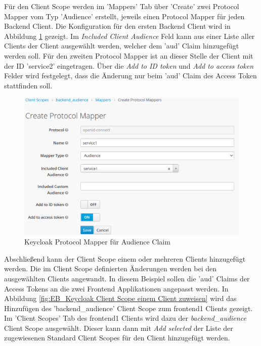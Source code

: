 Für den Client Scope werden im 'Mappers' Tab über 'Create' zwei Protocol Mapper vom Typ 'Audience' erstellt, jeweils einen Protocol Mapper für jeden Backend Client. Die Konfiguration für den ersten Backend Client wird in Abbildung \ref{fig:EB_Keycloak Protocol Mapper für Audience Claim} gezeigt. Im \textit{Included Client Audience} Feld kann aus einer Liste aller Clients der Client ausgewählt werden, welcher dem 'aud' Claim hinzugefügt werden soll. Für den zweiten Protocol Mapper ist an dieser Stelle der Client mit der ID 'service2' eingetragen. Über die \textit{Add to ID token} und \textit{Add to access token} Felder wird festgelegt, dass die Änderung nur beim 'aud' Claim des Access Token stattfinden soll.

\begin{figure}[!ht]
	\centering
	\includegraphics[width=1\textwidth]{Images/Ebert/KeycloakNewAudProtocolMapper.PNG}
	\caption{Keycloak Protocol Mapper für Audience Claim}
	\label{fig:EB_Keycloak Protocol Mapper für Audience Claim}
\end{figure}

Abschließend kann der Client Scope einem oder mehreren Clients hinzugefügt werden. Die im Client Scope definierten Änderungen werden bei den ausgewählten Clients angewandt. In diesem Beispiel sollen die 'aud' Claims der Access Tokens an die zwei Frontend Applikationen angepasst werden. In Abbildung \ref{fig:EB_Keycloak Client Scope einem Client zuweisen} wird das Hinzufügen des 'backend\_audience' Client Scope zum frontend1 Clients gezeigt. Im 'Client Scopes' Tab des frontend1 Clients wird dazu der \textit{backend\_audience} Client Scope ausgewählt. Dieser kann dann mit \textit{Add selected} der Liste der zugewiesenen Standard Client Scopes für den Client hinzugefügt werden.


